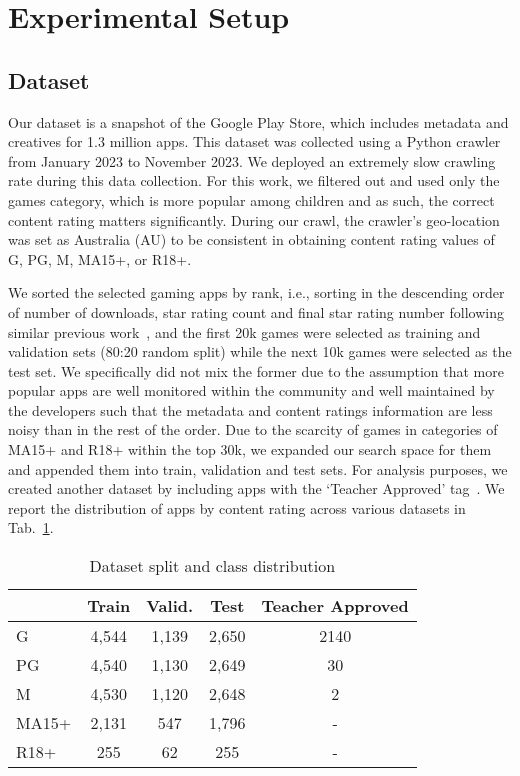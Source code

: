 \section{Experimental Setup}

\subsection{Dataset}
\label{Sec:dataset}
Our dataset is a snapshot of the Google Play Store, which includes metadata and creatives for 1.3 million apps. This dataset was collected using a Python crawler from January 2023 to November 2023. We deployed an extremely slow crawling rate during this data collection.
For this work, we filtered out and used only the games category, which is more popular among children and as such, the correct content rating matters significantly. During our crawl, the crawler's geo-location was set as Australia (AU) to be consistent in obtaining content rating values of G, PG, M, MA15+, or R18+.

We sorted the selected gaming apps by rank, i.e., sorting in the descending order of number of downloads, star rating count and final star rating number following similar previous work~\cite{seneviratne2015early,rajasegaran2019multi}, and the first 20k games were selected as training and validation sets (80:20 random split) while the next 10k games were selected as the test set. We specifically did not mix the former due to the assumption that more popular apps are well monitored within the community and well maintained by the developers such that the metadata and content ratings information are less noisy than in the rest of the order. Due to the scarcity of games in categories of MA15+ and R18+ within the top 30k, we expanded our search space for them and appended them into train, validation and test sets. For analysis purposes, we created another dataset by including apps with the `Teacher Approved' tag~\cite{teacherAApps}. We report the distribution of apps by content rating across various datasets in Tab.~\ref{tab:dataset_distribution}.


\begin{table}[ht]
    \centering
    \caption{Dataset split and class distribution}
    \label{tab:dataset_distribution}
    \begin{tabular}{l cccc}
    \hline
        & Train & Valid. & Test & Teacher Approved \\
        \hline
        G  & 4,544& 1,139&2,650& 2140\\
        PG & 4,540& 1,130&2,649& 30\\
        M  & 4,530& 1,120&2,648& 2\\
        MA15+ & 2,131& 547&1,796&- \\
        R18+ & 255& 62&255&- \\
        \hline
    \end{tabular}
\end{table}


